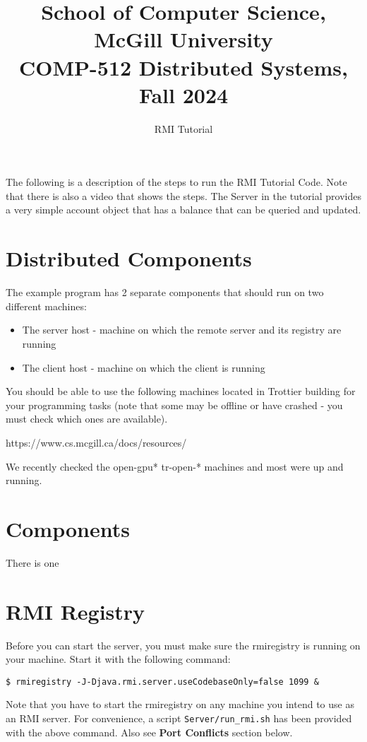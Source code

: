\documentclass[11pt]{article}
\title{\vspace{-0.5cm} {\small School of Computer Science, McGill University }
    \\COMP-512 Distributed Systems, Fall 2024 \\ \vspace{-0.3cm}}
\date{}
\author{RMI Tutorial \\ \vspace{-0.5cm}}
\begin{document}
\maketitle


The following is a description of the steps to run the RMI Tutorial Code. Note that there is also a video that shows the steps.
The Server in the tutorial provides a very simple account object that has a balance that can be queried and updated.


\section*{Distributed Components}

The example program has 2 separate components that should run on two different machines:

\begin{itemize}
				\item The server host - machine on which the remote server and its registry are running
				\item The client host - machine on which the client is running
\end{itemize}


You should be able to use the following machines located in Trottier building for your programming tasks (note that some may be offline or have crashed - you must check which ones are available). 

https://www.cs.mcgill.ca/docs/resources/

We recently checked the open-gpu* tr-open-* machines and most were up and running. 

\section*{Components}

There is one 

\section*{RMI Registry}

Before you can start the server, you must make sure the rmiregistry is running on your machine. Start it with the following command:

\texttt{\$ rmiregistry -J-Djava.rmi.server.useCodebaseOnly=false 1099 \& }

Note that you have to start the rmiregistry on any machine you intend to use as an RMI server. For convenience, a script \texttt{Server/run\_rmi.sh} has been provided with the above command. Also see \textbf{Port Conflicts} section below.
\end{document}
